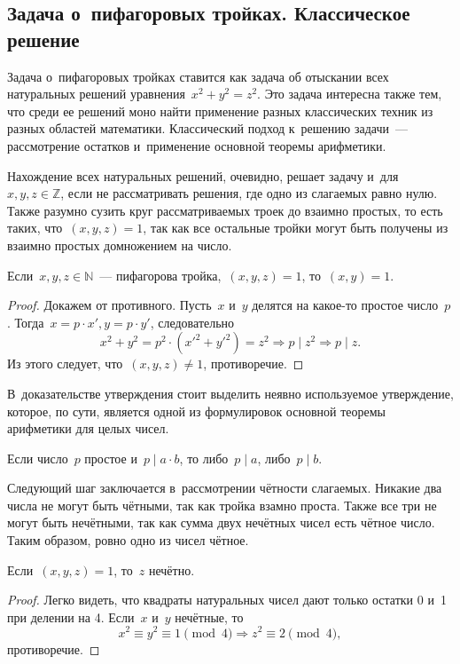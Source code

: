 \documentclass{article}
\begin{document}
\subsection{Задача о~пифагоровых тройках. Классическое решение}
Задача о~пифагоровых тройках ставится как задача об отыскании всех натуральных
решений уравнения~$x^2+y^2=z^2$. Это задача интересна также тем, что среди ее
решений моно найти применение разных классических техник из разных областей
математики. Классический подход к~решению задачи~--- рассмотрение остатков
и~применение основной теоремы арифметики.

Нахождение всех натуральных решений, очевидно, решает задачу
и~для $x, y, z \in \mathbb{Z}$, если не рассматривать решения, где одно из
слагаемых равно нулю. Также разумно сузить круг рассматриваемых троек
до взаимно простых, то есть таких, что~$(x, y, z) = 1$, так как все остальные
тройки могут быть получены из взаимно простых домножением на число.

\begin{claim}
  Если~$x, y, z \in \mathbb{N}$~--- пифагорова тройка,~$(x, y, z) = 1$,
  то~$(x, y) = 1$.
\end{claim}
\begin{proof}
  Докажем от противного. Пусть~$x$ и~$y$ делятся на какое-то простое
  число~$p$. Тогда~$x = p \cdot x', y = p \cdot y'$, следовательно
  $$x^2 + y^2 = p^2 \cdot \left(x'^2 + y'^2\right) = z^2 \Rightarrow
  p \mid z^2 \Rightarrow p \mid z.$$
  Из этого следует, что~$(x,y,z) \ne 1$, противоречие.
\end{proof}

В~доказательстве утверждения стоит выделить неявно используемое утверждение,
которое, по сути, является одной из формулировок основной теоремы арифметики
для целых чисел.

\begin{claim}
\label{prime_def}
  Если число~$p$ простое и~$p \mid a \cdot b$, то либо~$p \mid a$,
  либо~$p \mid b$.
\end{claim}

Следующий шаг заключается в~рассмотрении чётности слагаемых. Никакие два числа
не могут быть чётными, так как тройка взамно проста. Также все три не могут
быть нечётными, так как сумма двух нечётных чисел есть чётное число. Таким
образом, ровно одно из чисел чётное.

\begin{claim}
  Если~$(x, y, z) = 1$, то~$z$ нечётно.
\end{claim}
\begin{proof}
  Легко видеть, что квадраты натуральных чисел дают только остатки 0 и~1 при
  делении на 4. Если~$x$ и~$y$ нечётные, то
  $$x^2 \equiv y^2 \equiv 1 \pmod 4 \Rightarrow z^2 \equiv 2 \pmod 4,$$
  противоречие.
\end{proof}
\end{document}
